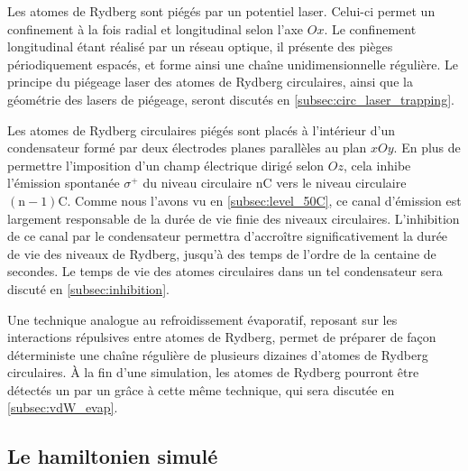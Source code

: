 Les atomes de Rydberg sont piégés par un potentiel laser.
Celui-ci permet un confinement à la fois radial et longitudinal selon l'axe $Ox$.
Le confinement longitudinal étant réalisé par un réseau optique, il présente des pièges périodiquement espacés, et forme ainsi une chaîne unidimensionnelle régulière.
Le principe du piégeage laser des atomes de Rydberg circulaires, ainsi que la géométrie des lasers de piégeage, seront discutés en \ref{subsec:circ_laser_trapping}.

Les atomes de Rydberg circulaires piégés sont placés à l'intérieur d'un condensateur formé par deux électrodes planes parallèles au plan $xOy$.
En plus de permettre l'imposition d'un champ électrique dirigé selon $Oz$, cela inhibe l'émission spontanée $\sigma^+$ du niveau circulaire $\mathrm{nC}$ vers le niveau circulaire $\mathrm{(n-1)C}$.
Comme nous l'avons vu en \ref{subsec:level_50C}, ce canal d'émission est largement responsable de la durée de vie finie des niveaux circulaires.
L'inhibition de ce canal par le condensateur permettra d'accroître significativement la durée de vie des niveaux de Rydberg, jusqu'à des temps de l'ordre de la centaine de secondes.
Le temps de vie des atomes circulaires dans un tel condensateur sera discuté en \ref{subsec:inhibition}.

Une technique analogue au refroidissement évaporatif, reposant sur les interactions répulsives entre atomes de Rydberg, permet de préparer de façon déterministe une chaîne régulière de plusieurs dizaines d'atomes de Rydberg circulaires.
\`A la fin d'une simulation, les atomes de Rydberg pourront être détectés un par un grâce à cette même technique, qui sera discutée en \ref{subsec:vdW_evap}.

\subsection{Le hamiltonien simulé}\label{subsec:XXZhamiltonian}
